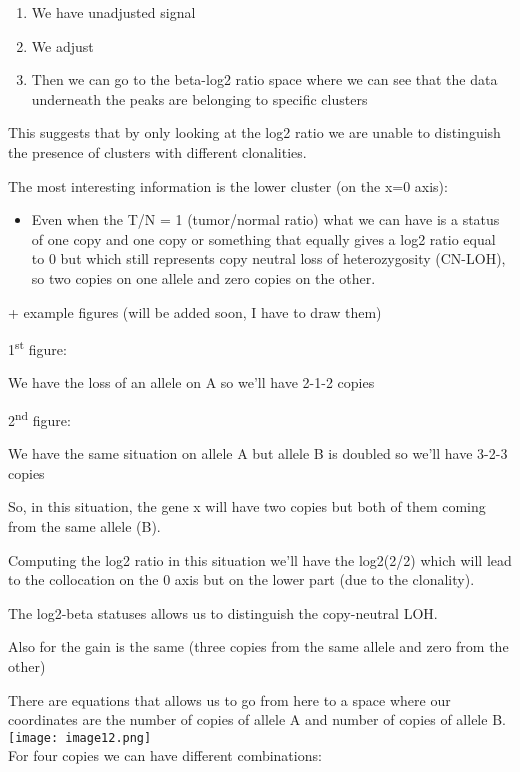 \begin{enumerate}
\def\labelenumi{\arabic{enumi}.}
\item
  We have unadjusted signal
\item
  We adjust
\item
  Then we can go to the beta-log2 ratio space where we can see that the data
  underneath the peaks are belonging to specific clusters
\end{enumerate}

This suggests that by only looking at the log2 ratio we are unable to
distinguish the presence of clusters with different clonalities.

The most interesting information is the lower cluster (on the x=0 axis):

\begin{itemize}
\item
  Even when the T/N = 1 (tumor/normal ratio) what we can have is a status of one
  copy and one copy or something that equally gives a log2 ratio equal to 0 but
  which still represents copy neutral loss of heterozygosity (CN-LOH), so two
  copies on one allele and zero copies on the other.
\end{itemize}

+ example figures (will be added soon, I have to draw them)

1\textsuperscript{st} figure:

We have the loss of an allele on A so we'll have 2-1-2 copies

2\textsuperscript{nd} figure:

We have the same situation on allele A but allele B is doubled so we'll have
3-2-3 copies

So, in this situation, the gene x will have two copies but both of them coming
from the same allele (B).

Computing the log2 ratio in this situation we'll have the log2(2/2) which will
lead to the collocation on the 0 axis but on the lower part (due to the
clonality).

The log2-beta statuses allows us to distinguish the copy-neutral LOH.

Also for the gain is the same (three copies from the same allele and zero from
the other)

There are equations that allows us to go from here to a space where our
coordinates are the number of copies of allele A and number of copies of allele
B.\\
\texttt{[image: image12.png]}\\
For four copies
we can have different combinations:

